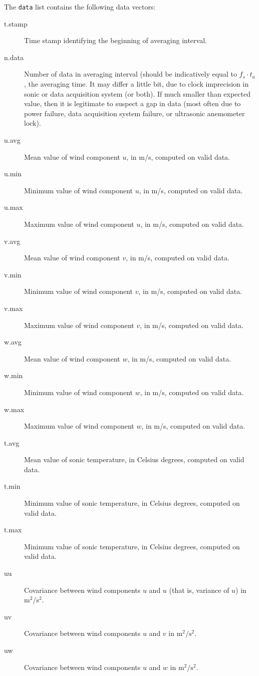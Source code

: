 \documentclass[a4paper,10pt]{book}
\begin{document}
The \verb|data| list contains the following data vectors:

\begin{description}
 \item[t.stamp] Time stamp identifying the beginning of averaging interval.
 \item[n.data] Number of data in averaging interval (should be indicatively equal to $f_{s} \cdot t_{a}$, the averaging time. It may differ a little bit, due to clock imprecision in sonic or data acquisition system (or both). If much smaller than expected value, then it is legitimate to suspect a gap in data (most often due to power failure, data acquisition system failure, or ultrasonic anemometer lock).
 \item[u.avg] Mean value of wind component $u$, in m/s, computed on valid data.
 \item[u.min] Minimum value of wind component $u$, in m/s, computed on valid data.
 \item[u.max] Maximum value of wind component $u$, in m/s, computed on valid data.
 \item[v.avg] Mean value of wind component $v$, in m/s, computed on valid data.
 \item[v.min] Minimum value of wind component $v$, in m/s, computed on valid data.
 \item[v.max] Maximum value of wind component $v$, in m/s, computed on valid data.
 \item[w.avg] Mean value of wind component $w$, in m/s, computed on valid data.
 \item[w.min] Minimum value of wind component $w$, in m/s, computed on valid data.
 \item[w.max] Maximum value of wind component $w$, in m/s, computed on valid data.
 \item[t.avg] Mean value of sonic temperature, in Celsius degrees, computed on valid data.
 \item[t.min] Minimum value of sonic temperature, in Celsius degrees, computed on valid data.
 \item[t.max] Minimum value of sonic temperature, in Celsius degrees, computed on valid data.
 \item[uu] Covariance between wind components $u$ and $u$ (that is, variance of $u$) in $\mbox{m}^2/\mbox{s}^2$.
 \item[uv] Covariance between wind components $u$ and $v$ in $\mbox{m}^2/\mbox{s}^2$.
 \item[uw] Covariance between wind components $u$ and $w$ in $\mbox{m}^2/\mbox{s}^2$.

\end{description}
\end{document}
